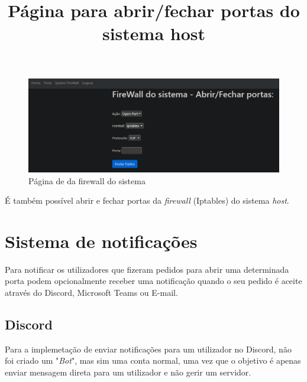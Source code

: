 \title*{\textbf{Página para abrir/fechar portas do sistema host}}

\begin{figure}[H]
\begin{center}
\includegraphics[width=16cm]{figs/sysfirewall.png}
\caption{Página de da firewall do sistema}
\label{fig:bookstack}
\end{center}
\end{figure}

É também possível abrir e fechar portas da \textit{firewall} (Iptables) 
do sistema \textit{host}.









\section{Sistema de notificações}

Para notificar os utilizadores que fizeram pedidos para abrir uma determinada
porta podem opcionalmente receber uma notificação quando o seu pedido é aceite 
através do Discord, Microsoft Teams ou E-mail.

\subsection{Discord}

Para a implemetação de enviar notificações para um utilizador no Discord,
não foi criado um "\textit{Bot}", mas sim uma conta normal, uma vez que o objetivo é apenas
enviar mensagem direta para um utilizador e não gerir um servidor.

